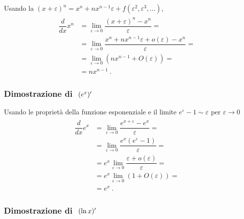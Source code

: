 \documentclass[letterpaper,10pt,italian]{jupyterBook}
\begin{document}
\sphinxAtStartPar
Usando la {\hyperref[\detokenize{ch/precalculus/polynomials:math-hs-precalculus-polynomials-binomial-thm}]{}} \((x + \varepsilon)^n = x^n + n x^{n-1} \varepsilon + f(\varepsilon^2, \varepsilon^3, \dots)\),
\begin{equation*}
\begin{split}\begin{aligned}
  \dfrac{d}{dx} x^n
  & = \lim_{\varepsilon \rightarrow 0}  \dfrac{(x+\varepsilon)^{n} - x^n}{\varepsilon} = \\
  & = \lim_{\varepsilon \rightarrow 0}  \dfrac{x^n + n x^{n-1} \varepsilon + o(\varepsilon) - x^n}{\varepsilon} = \\
  & = \lim_{\varepsilon \rightarrow 0}  \left( n x^{n-1} + O(\varepsilon) \right) = \\
  & = n x^{n-1} \ .
\end{aligned}\end{split}
\end{equation*}\subsubsection*{Dimostrazione di \protect\(\ (e^x)'\protect\)}

\sphinxAtStartPar
Usando le proprietà della funzione esponenziale e il limite \(e^{\varepsilon} - 1 \sim \varepsilon\) per \(\varepsilon \rightarrow 0\)
\begin{equation*}
\begin{split}\begin{aligned}
  \dfrac{d}{dx} e^x       
  & = \lim_{\varepsilon \rightarrow 0}  \dfrac{e^{x+\varepsilon} - e^x}{\varepsilon} = \\
  & = \lim_{\varepsilon \rightarrow 0}  \dfrac{e^x \left( e^{\varepsilon} - 1 \right)}{\varepsilon} = \\
  & = e^x \lim_{\varepsilon \rightarrow 0}  \dfrac{\varepsilon + o(\varepsilon)}{\varepsilon} = \\
  & = e^x \lim_{\varepsilon \rightarrow 0}  \left( 1 + O(\varepsilon) \right) = \\
  & = e^x \ .
\end{aligned}\end{split}
\end{equation*}\subsubsection*{Dimostrazione di \protect\(\ (\ln x)'\protect\)}
\end{document}
